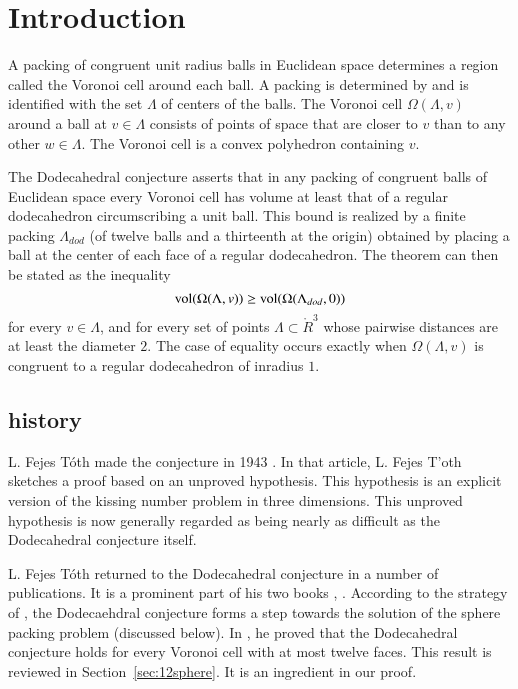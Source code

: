 
\section{Introduction}


\label{sec:dodec}

A packing of congruent unit radius balls 
in Euclidean space determines a region called the Voronoi cell 
around each ball.  
A packing is determined by and is identified  with the set $\Lambda$ of centers of the balls.  The Voronoi
cell $\Omega(\Lambda,v)$ around a ball at $v\in \Lambda$ 
consists of points of space that are closer to $v$ than
to any other $w\in\Lambda$.  The Voronoi cell is a
convex polyhedron containing $v$.

The Dodecahedral conjecture asserts that in any packing of congruent balls of Euclidean
space every Voronoi cell has volume at least that of a regular dodecahedron
circumscribing a unit ball.    This bound is realized by a finite 
packing $\Lambda_{dod}$
(of twelve balls and a thirteenth  at the origin) obtained
by placing a ball at the center of each face of a regular dodecahedron.  The
theorem can then be stated as the inequality
  $$
  {\operatorname{vol}}(\Omega(\Lambda,v)) \ge {\operatorname{vol}}(\Omega(\Lambda_{dod},0))
  $$
for every $v\in\Lambda$, and for every set of points $\Lambda\subset \ring{R}^3$
whose pairwise distances are at least the diameter $2$.
The case of equality occurs exactly when $\Omega(\Lambda,v)$ is
congruent to a regular dodecahedron of inradius $1$.



\subsection{history}


L. Fejes T\'oth made the conjecture in 1943 \cite{Toth1}.  
In that article, L. Fejes
T'oth sketches a proof based on an unproved hypothesis.  This
hypothesis is an explicit version of the kissing number problem
in three dimensions.   This unproved hypothesis
is now generally regarded as being 
nearly as difficult as the  Dodecahedral conjecture itself.  

L. Fejes T\'oth returned to the Dodecahedral conjecture in a number
of publications.  It is a prominent part of his two books \cite{Fej72},
\cite{Toth2}.  According to the strategy of \cite{Fej72}, 
the Dodecaehdral conjecture forms a
step towards the solution of the sphere packing problem
(discussed below).   In \cite{Toth2}, he proved that the Dodecahedral conjecture
holds for every Voronoi cell with at most twelve faces.  
This result is reviewed in Section~\ref{sec:12sphere}.  It
is an ingredient in our proof. 

